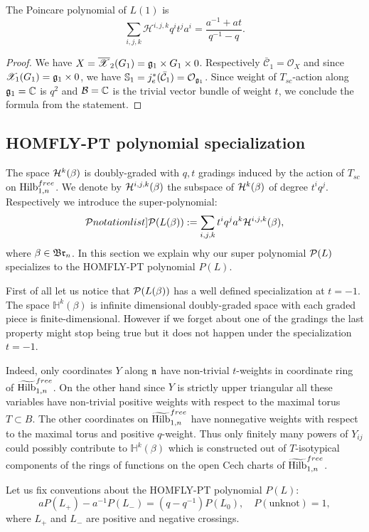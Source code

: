 \documentclass[10pt]{amsart}
\begin{document}
\begin{proposition} The Poincare polynomial of \(L(1)\) is
  \[\sum_{i,j,k}\mathcal{H}^{i,j,k}q^it^j a^i=\frac{a^{-1}+at}{q^{-1}-q}.\]
\end{proposition}
\begin{proof}
  We have \(X=\overline{\mathscr{X}}_2(G_1)=\mathfrak{g}_1\times G_1\times 0\). Respectively \(\bar{\mathcal{C}}_1=\mathcal{O}_X\) and since \(\mathscr{X}_1(G_1)=\mathfrak{g}_1\times 0\), we have
  \(\mathbb{S}_1=j^*_e(\bar{\mathcal{C}}_1)=\mathcal{O}_{\mathfrak{g}_1}\). Since weight of \(T_{sc}\)-action along \(\mathfrak{g}_1=\mathbb{C}\)  is \(q^2\) and \(\mathcal{B}=\mathbb{C}\) is
  the trivial vector bundle of weight \(t\), we conclude the formula from the statement.
\end{proof}
\subsection{HOMFLY-PT polynomial specialization}
The space $\mathcal{H}^k(\beta)$ is  doubly-graded with $q,t$ gradings induced by the action of $T_{sc}$ on $\mathrm{Hilb}^{free}_{1,n}$. We denote by $\mathcal{H}^{i,j,k}(\beta)$ the subspace of
$\mathcal{H}^k(\beta)$ of degree $t^iq^j$. Respectively we introduce the super-polynomial:
$$\SymbolPrint{\calP}(L(\beta)):= \sum_{i,j,k} t^iq^j a^k \calH^{i,j,k}(\beta),$$
where $\beta\in \mathfrak{Br}_n$.
In this section we explain why our super polynomial $\mathcal{P}(L)$ specializes to the HOMFLY-PT polynomial $P(L)$.

First of all let us notice that
$\mathcal{P}(L(\beta))$ has  a well defined specialization at $t=-1$. The space \(\mathbb{H}^k(\beta)\) is infinite dimensional doubly-graded space with each graded piece is
finite-dimensional. However if we forget about one of the gradings the last property might stop being true but it does not happen under the specialization \(t=-1\).

Indeed,  only coordinates $Y$ along $\mathfrak{n}$ have non-trivial $t$-weights in coordinate ring of $\widetilde{\mathrm{Hilb}}_{1,n}^{free}$. On the other hand since
$Y$ is strictly upper triangular all these variables have non-trivial positive weights with respect to the maximal torus \(T\subset B\).
The other coordinates on $\widetilde{\mathrm{Hilb}}_{1,n}^{free}$ have nonnegative weights with respect to the maximal torus and positive \(q\)-weight.
Thus only finitely many powers of $Y_{ij}$ could possibly contribute to $\mathbb{H}^k(\beta)$ which is constructed out of \(T\)-isotypical components
of the rings of functions on the open Cech charts of \(\widetilde{\mathrm{Hilb}}_{1,n}^{free}\).

Let us fix  conventions about the HOMFLY-PT polynomial $P(L)$:
$$ aP(L_+)-a^{-1} P(L_-)=(q-q^{-1})P(L_0), \quad P(\mathrm{unknot})=1,$$
where $L_+$ and $L_-$ are positive and negative crossings.
\end{document}
